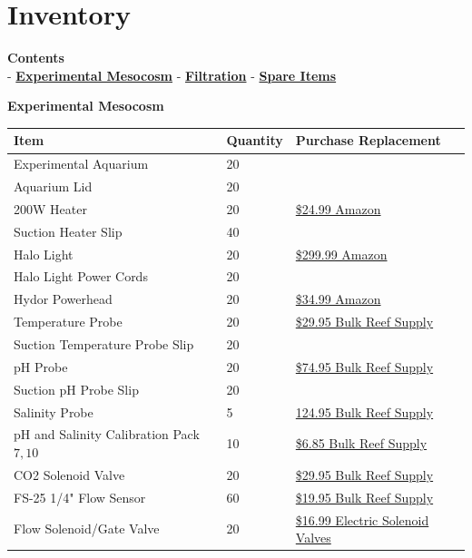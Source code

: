 \documentclass[]{book}
\begin{document}
\chapter{Inventory}\label{inventory}

\textbf{Contents}\\
- \protect\hyperlink{Experimental_Mesocosm}{\textbf{Experimental
Mesocosm}} - \protect\hyperlink{Filtration}{\textbf{Filtration}} -
\protect\hyperlink{Spare_Items}{\textbf{Spare Items}}

 \textbf{Experimental Mesocosm}

\begin{longtable}[]{@{}lll@{}}
\toprule
Item & Quantity & Purchase Replacement\tabularnewline
\midrule
\endhead
Experimental Aquarium & 20 &\tabularnewline
Aquarium Lid & 20 &\tabularnewline
200W Heater & 20 &
\href{https://www.amazon.com/Hydor-Submersible-Glass-Aquarium-Heater/dp/B00061UQ7K}{\$24.99
Amazon}\tabularnewline
Suction Heater Slip & 40 &\tabularnewline
Halo Light & 20 &
\href{https://www.amazon.com/Aquatic-Life-Halo-Basic-Fixture/dp/B00T6FGDJW}{\$299.99
Amazon}\tabularnewline
Halo Light Power Cords & 20 &\tabularnewline
Hydor Powerhead & 20 &
\href{https://www.amazon.com/Hydor-Koralia-Nano-Aquarium-Circulation/dp/B0036S70ZG/ref=sr_1_2?keywords=hydor+powerhead\&qid=1572981966\&s=pet-supplies\&sr=1-2}{\$34.99
Amazon}\tabularnewline
Temperature Probe & 20 &
\href{https://www.bulkreefsupply.com/temperature-probe-neptune-systems.html}{\$29.95
Bulk Reef Supply}\tabularnewline
Suction Temperature Probe Slip & 20 &\tabularnewline
pH Probe & 20 &
\href{https://www.bulkreefsupply.com/lab-grade-double-junction-ph-probe-neptune-systems.html}{\$74.95
Bulk Reef Supply}\tabularnewline
Suction pH Probe Slip & 20 &\tabularnewline
Salinity Probe & 5 &
\href{https://www.bulkreefsupply.com/neptune-systems-lab-grade-conductivity-probe.html}{124.95
Bulk Reef Supply}\tabularnewline
pH and Salinity Calibration Pack \(7,10\) & 10 &
\href{https://www.bulkreefsupply.com/probe-calibration-kit-ph-7-0-ph-10-0-salinity-53000us-neptune-systems.html}{\$6.85
Bulk Reef Supply}\tabularnewline
CO2 Solenoid Valve & 20 &
\href{https://www.bulkreefsupply.com/sv-1-solenoid-valve-neptune-systems.html}{\$29.95
Bulk Reef Supply}\tabularnewline
FS-25 1/4" Flow Sensor & 60 &
\href{https://www.bulkreefsupply.com/1-4-flow-sensor-fs25-neptune-systems.html}{\$19.95
Bulk Reef Supply}\tabularnewline
Flow Solenoid/Gate Valve & 20 &
\href{https://www.electricsolenoidvalves.com/1-4-120v-ac-electric-plastic-solenoid-valve/}{\$16.99
Electric Solenoid Valves}\tabularnewline

\end{longtable}
\end{document}
